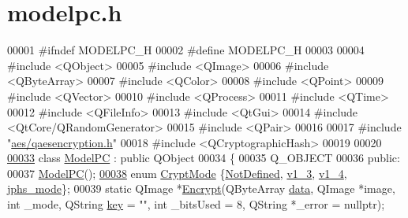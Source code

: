 \hypertarget{modelpc_8h_source}{}\section{modelpc.\+h}

\begin{DoxyCode}
00001 \textcolor{preprocessor}{#ifndef MODELPC\_H}
00002 \textcolor{preprocessor}{#define MODELPC\_H}
00003 
00004 \textcolor{preprocessor}{#include <QObject>}
00005 \textcolor{preprocessor}{#include <QImage>}
00006 \textcolor{preprocessor}{#include <QByteArray>}
00007 \textcolor{preprocessor}{#include <QColor>}
00008 \textcolor{preprocessor}{#include <QPoint>}
00009 \textcolor{preprocessor}{#include <QVector>}
00010 \textcolor{preprocessor}{#include <QProcess>}
00011 \textcolor{preprocessor}{#include <QTime>}
00012 \textcolor{preprocessor}{#include <QFileInfo>}
00013 \textcolor{preprocessor}{#include <QtGui>}
00014 \textcolor{preprocessor}{#include <QtCore/QRandomGenerator>}
00015 \textcolor{preprocessor}{#include <QPair>}
00016 
00017 \textcolor{preprocessor}{#include "\hyperlink{qaesencryption_8h}{aes/qaesencryption.h}"}
00018 \textcolor{preprocessor}{#include <QCryptographicHash>}
00019 
00020 
\hypertarget{modelpc_8h_source.tex_l00033}{}\hyperlink{class_model_p_c}{00033} \textcolor{keyword}{class }\hyperlink{class_model_p_c}{ModelPC} : \textcolor{keyword}{public} QObject
00034 \{
00035     Q\_OBJECT
00036 \textcolor{keyword}{public}:
00037     \hyperlink{class_model_p_c_ae12ebe65ec973c02a0de4850a7c1e31c}{ModelPC}();
\hypertarget{modelpc_8h_source.tex_l00038}{}\hyperlink{class_model_p_c_a296dd7afe3e1c49b3da25fd644fe4ceba43138df6b33a6b2bf608768907f95abc}{00038}     \textcolor{keyword}{enum} \hyperlink{class_model_p_c_a296dd7afe3e1c49b3da25fd644fe4ceb}{CryptMode} \{\hyperlink{class_model_p_c_a296dd7afe3e1c49b3da25fd644fe4ceba287198790ac9799acd03c99d63a6faea}{NotDefined}, \hyperlink{class_model_p_c_a296dd7afe3e1c49b3da25fd644fe4ceba7612e38de7178170655a56ddcf96e12c}{v1\_3}, \hyperlink{class_model_p_c_a296dd7afe3e1c49b3da25fd644fe4ceba43138df6b33a6b2bf608768907f95abc}{v1\_4}, \hyperlink{class_model_p_c_a296dd7afe3e1c49b3da25fd644fe4ceba90ca32d3ccbb6be224cdfc33f7096eea}{jphs\_mode}\};
00039     \textcolor{keyword}{static} QImage *\hyperlink{class_model_p_c_a271cf9285e32df58ffbfc918e6482bbd}{Encrypt}(QByteArray \hyperlink{namespace_errors_dict_setup_af570460846fb9f0c91abd308a095dcdc}{data}, QImage *image, \textcolor{keywordtype}{int} \_mode, QString 
      \hyperlink{namespace_errors_dict_setup_a09c268098d09ffb8e5504f30fa6d5dd9}{key} = \textcolor{stringliteral}{""}, \textcolor{keywordtype}{int} \_bitsUsed = 8, QString *\_error = \textcolor{keyword}{nullptr});

\end{DoxyCode}
